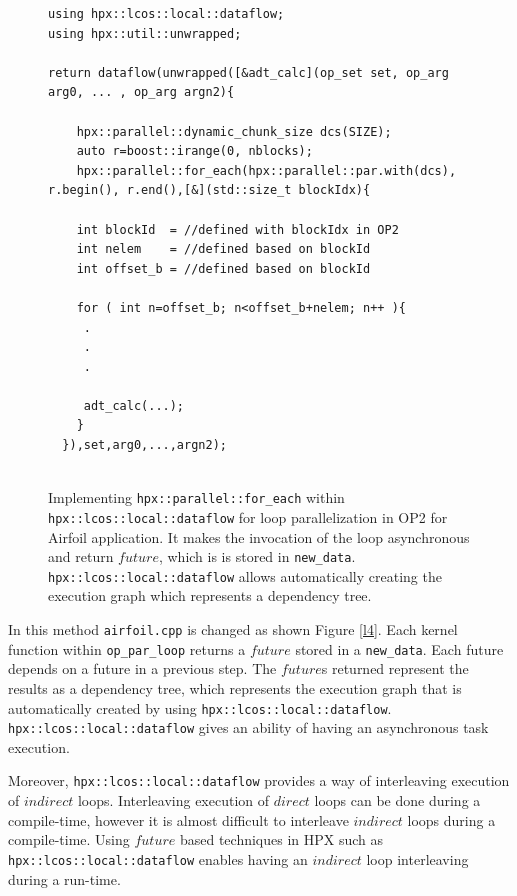 \documentclass[conference]{IEEEtran}
\begin{document}
\begin{figure} [!h]
    \begin{lstlisting}    
using hpx::lcos::local::dataflow;
using hpx::util::unwrapped;    

return dataflow(unwrapped([&adt_calc](op_set set, op_arg arg0, ... , op_arg argn2){

    hpx::parallel::dynamic_chunk_size dcs(SIZE);
    auto r=boost::irange(0, nblocks);
    hpx::parallel::for_each(hpx::parallel::par.with(dcs), r.begin(), r.end(),[&](std::size_t blockIdx){
  
    int blockId  = //defined with blockIdx in OP2
    int nelem    = //defined based on blockId 
    int offset_b = //defined based on blockId
        
    for ( int n=offset_b; n<offset_b+nelem; n++ ){
     .
     .
     .

     adt_calc(...);
    }
  }),set,arg0,...,argn2);
  
    \end{lstlisting}
    \caption{\small{Implementing \texttt{hpx::parallel::for\_each} within \texttt{hpx::lcos::local::dataflow} for loop parallelization in OP2 for Airfoil application. It makes the invocation of the loop asynchronous and return $future$, which is is stored in \texttt{new\_data}. \texttt{hpx::lcos::local::dataflow} allows automatically creating the execution graph which represents a dependency tree.}}
    \label{l3b}
\end{figure}



In this method \texttt{airfoil.cpp} is changed as shown Figure \ref{l4}. Each kernel function within \texttt{op\_par\_loop} returns a $future$ stored in a \texttt{new\_data}. Each future depends on a future in a previous step. The $future$s returned represent the results as a dependency tree, which represents the execution graph that is automatically created by using \texttt{hpx::lcos::local::dataflow}. \texttt{hpx::lcos::local::dataflow} gives an ability of having an asynchronous task execution. 

Moreover, \texttt{hpx::lcos::local::dataflow} provides a way of interleaving execution of $indirect$ loops. Interleaving execution of $direct$ loops can be done during a compile-time, however it is almost difficult to interleave $indirect$ loops during a compile-time. Using $future$ based techniques in HPX such as \texttt{hpx::lcos::local::dataflow} enables having an $indirect$ loop interleaving during a run-time.  
\end{document}
